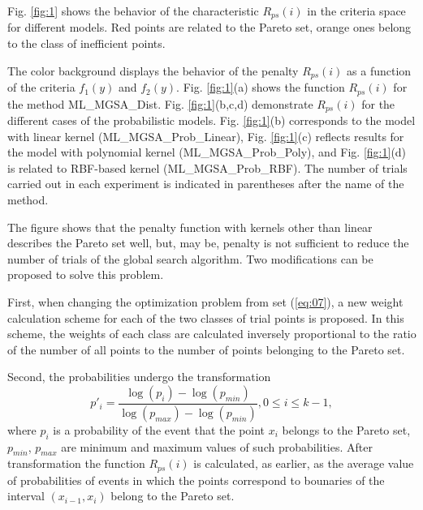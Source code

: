 \documentclass[runningheads]{llncs}
\begin{document}
Fig. \ref{fig:1} shows the behavior of the characteristic $R_{ps}(i)$ in the criteria space for different models. Red points are related to the Pareto set, orange ones belong to the class of inefficient points. 

The color background displays the behavior of the penalty $R_{ps}(i)$ as a function of the criteria $f_1(y)$ and $f_2(y)$. Fig. \ref{fig:1}(a) shows the function $R_{ps}(i)$ for the method ML\_MGSA\_Dist. Fig. \ref{fig:1}(b,c,d) demonstrate $R_{ps}(i)$ for the different cases of the probabilistic models. Fig. \ref{fig:1}(b) corresponds to the model with linear kernel (ML\_MGSA\_Prob\_Linear), Fig. \ref{fig:1}(c) reflects results for the model with polynomial kernel (ML\_MGSA\_Prob\_Poly), and Fig. \ref{fig:1}(d) is related to RBF-based kernel (ML\_MGSA\_Prob\_RBF).
The number of trials carried out in each experiment is indicated in parentheses after the name of the method.

The figure shows that the penalty function with kernels other than linear describes the Pareto set well, but, may be, penalty is not sufficient to reduce the number of trials of the global search algorithm. Two modifications can be proposed to solve this problem.

First, when changing the optimization problem from set (\ref{eq:07}), a new weight calculation scheme for each of the two classes of trial points is proposed. In this scheme, the weights of each class are calculated inversely proportional to the ratio of the number of all points to the number of points belonging to the Pareto set.

Second, the probabilities undergo the transformation
\begin{equation}
    \label{eq:18}
p'_i= \frac{ \log (p_i) - \log (p_{min})}{ \log (p_{max}) - \log (p_{min})} , 0 \leq i \leq k-1,
\end{equation}
where $p_i$ is a probability of the event that the point $x_i$ belongs to the Pareto set, $p_{min}$, $p_{max}$ are minimum and maximum values of such probabilities. After transformation the function $R_{ps}(i)$ is calculated, as earlier, as the average value of probabilities of events in which the points correspond to bounaries of the interval $(x_{i-1}, x_i)$ belong to the Pareto set.
\end{document}
